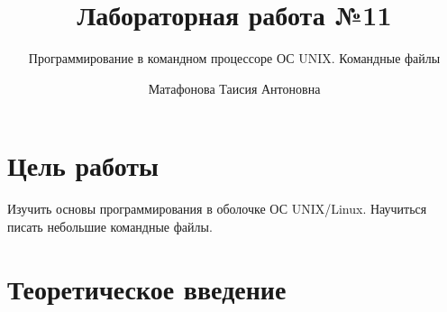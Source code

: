 \documentclass[
  letterpaper,
  DIV=11,
  numbers=noendperiod]{scrartcl}
\title{Лабораторная работа №11}
\subtitle{Программирование в командном процессоре ОС UNIX. Командные
файлы}
\author{Матафонова Таисия Антоновна}
\date{}
\begin{document}
\maketitle


\section{Цель
работы}\label{ux446ux435ux43bux44c-ux440ux430ux431ux43eux442ux44b}

Изучить основы программирования в оболочке ОС UNIX/Linux. Научиться
писать небольшие командные файлы.

\section{Теоретическое
введение}\label{ux442ux435ux43eux440ux435ux442ux438ux447ux435ux441ux43aux43eux435-ux432ux432ux435ux434ux435ux43dux438ux435}
\end{document}
